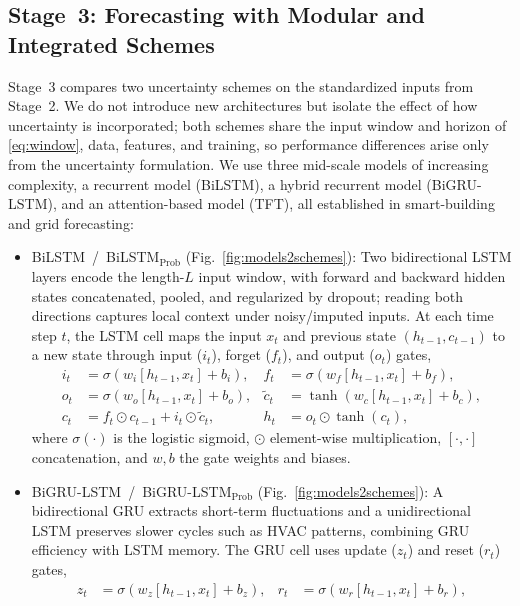 \documentclass[final,10pt,1p,authoryear]{elsarticle}
\theoremstyle{definition}
\begin{document}
\subsection{Stage~3: Forecasting with Modular and Integrated Schemes}\label{sec:models}
Stage~3 compares two uncertainty schemes on the standardized inputs from Stage~2. We do not introduce new architectures but isolate the effect of how uncertainty is incorporated; both schemes share the input window and horizon of \eqref{eq:window}, data, features, and training, so performance differences arise only from the uncertainty formulation. We use three mid-scale models of increasing complexity, a recurrent model (BiLSTM), a hybrid recurrent model (BiGRU-LSTM), and an attention-based model (TFT), all established in smart-building and grid forecasting:
\begin{itemize}[leftmargin=1em]
\item {BiLSTM~/~BiLSTM$_\text{Prob}$} (Fig.~\ref{fig:models2schemes}): Two bidirectional LSTM layers encode the length-$L$ input window, with forward and backward hidden states concatenated, pooled, and regularized by dropout; reading both directions captures local context under noisy/imputed inputs. At each time step $t$, the LSTM cell maps the input $x_t$ and previous state $(h_{t-1},c_{t-1})$ to a new state through input ($i_t$), forget ($f_t$), and output ($o_t$) gates,
\begin{equation}
\begin{aligned}
i_t&=\sigma(w_i[h_{t-1},x_t]+b_i), & f_t&=\sigma(w_f[h_{t-1},x_t]+b_f),\\
o_t&=\sigma(w_o[h_{t-1},x_t]+b_o), & \tilde{c}_t&=\tanh(w_c[h_{t-1},x_t]+b_c),\\
c_t&=f_t\odot c_{t-1}+i_t\odot\tilde{c}_t, & h_t&=o_t\odot\tanh(c_t),
\end{aligned}
\end{equation}
where $\sigma(\cdot)$ is the logistic sigmoid, $\odot$ element-wise multiplication, $[\cdot,\cdot]$ concatenation, and $w,b$ the gate weights and biases.
\item {BiGRU-LSTM~/~BiGRU-LSTM$_\text{Prob}$} (Fig.~\ref{fig:models2schemes}): A bidirectional GRU extracts short-term fluctuations and a unidirectional LSTM preserves slower cycles such as HVAC patterns, combining GRU efficiency with LSTM memory. The GRU cell uses update ($z_t$) and reset ($r_t$) gates,
\begin{equation}
\begin{aligned}
z_t&=\sigma(w_z[h_{t-1},x_t]+b_z), & r_t&=\sigma(w_r[h_{t-1},x_t]+b_r),\\

\end{aligned}
\end{equation}
\end{itemize}
\end{document}
